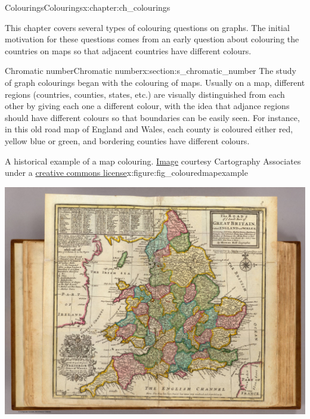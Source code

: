 \documentclass[oneside,10pt,]{book}
\numberwithin{equation}{section}
\begin{document}
\begin{chapterptx}{Colourings}{}{Colourings}{}{}{x:chapter:ch_colourings}
\begin{introduction}{}%
This chapter covers several types of colouring questions on graphs.  The initial motivation for these questions comes from an early question about colouring the countries on maps so that adjacent countries have different colours.%
\end{introduction}%
%
%
\typeout{************************************************}
\typeout{************************************************}
%
\begin{sectionptx}{Chromatic number}{}{Chromatic number}{}{}{x:section:s_chromatic_number}
The study of graph colourings began with the colouring of maps.  Usually on a map, different regions (countries, counties, states, etc.) are visually distinguished from each other by giving each one a different colour, with the idea that adjance regions should have different colours so that boundaries can be easily seen.  For instance, in this old road map of England and Wales, each county is coloured either red, yellow blue or green, and bordering counties have different colours.%
\begin{figureptx}{A historical example of a map colouring.  \href{http://www.davidrumsey.com/maps4669.html}{Image} courtesy Cartography Associates under a \href{https://creativecommons.org/licenses/by-nc-sa/2.0/}{creative commons license}}{x:figure:fig_colouredmapexample}{}%
\begin{image}{0.15}{0.7}{0.15}%
\includegraphics[width=\linewidth]{images/EnglishCounties.jpg}

\end{image}
\end{figureptx}
\end{sectionptx}
\end{chapterptx}
\end{document}
